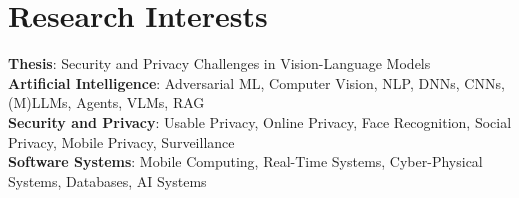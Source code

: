 \section{Research Interests}
 \begin{itemize}[leftmargin=0.5cm, label={}]
    \small{\item{
     \textbf{Thesis}{: Security and Privacy Challenges in Vision-Language Models} \\\vspace{1pt}
     \textbf{Artificial Intelligence}{: Adversarial ML, Computer Vision, NLP, DNNs, CNNs, (M)LLMs, Agents, VLMs, RAG} \\\vspace{1pt}
     \textbf{Security and Privacy}{: Usable Privacy, Online Privacy, Face Recognition, Social Privacy, Mobile Privacy, Surveillance} \\\vspace{1pt}
     \textbf{Software Systems}{: Mobile Computing, Real-Time Systems, Cyber-Physical Systems, Databases, AI Systems} \\\vspace{1pt}
    }}
 \end{itemize}